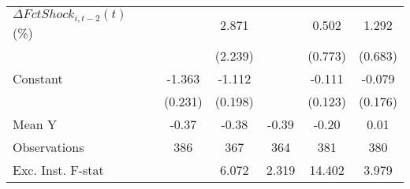 {\begin{tabular}{l*{5}{c}}
\addlinespace
$ \Delta FctShock_{i,t-2}(t)$ (\%)&                     &       2.871         &                     &       0.502         &       1.292\sym{*}  \\
                    &                     &     (2.239)         &                     &     (0.773)         &     (0.683)         \\
\addlinespace
Constant            &      -1.363\sym{***}&      -1.112\sym{***}&                     &      -0.111         &      -0.079         \\
                    &     (0.231)         &     (0.198)         &                     &     (0.123)         &     (0.176)         \\
\midrule
Mean Y              &       -0.37         &       -0.38         &       -0.39         &       -0.20         &        0.01         \\
Observations        &         386         &         367         &         364         &         381         &         380         \\
Exc. Inst. F-stat   &                     &       6.072         &       2.319         &      14.402         &       3.979         \\
\bottomrule
\end{tabular}
}
